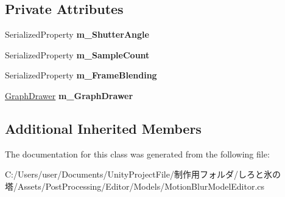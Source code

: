 \subsection*{Private Attributes}
\begin{DoxyCompactItemize}
\item 
\mbox{\label{class_unity_editor_1_1_post_processing_1_1_motion_blur_model_editor_a8971598b51aade8888273ed34cbd41c4}} 
Serialized\+Property {\bfseries m\+\_\+\+Shutter\+Angle}
\item 
\mbox{\label{class_unity_editor_1_1_post_processing_1_1_motion_blur_model_editor_af6591ad5bd48220a93255576aa105371}} 
Serialized\+Property {\bfseries m\+\_\+\+Sample\+Count}
\item 
\mbox{\label{class_unity_editor_1_1_post_processing_1_1_motion_blur_model_editor_a71fcbc99722e28f94295ab274af65436}} 
Serialized\+Property {\bfseries m\+\_\+\+Frame\+Blending}
\item 
\mbox{\label{class_unity_editor_1_1_post_processing_1_1_motion_blur_model_editor_aa1875a8330ad6e855a15b28fd9816d51}} 
\hyperlink{class_unity_editor_1_1_post_processing_1_1_motion_blur_model_editor_1_1_graph_drawer}{Graph\+Drawer} {\bfseries m\+\_\+\+Graph\+Drawer}
\end{DoxyCompactItemize}
\subsection*{Additional Inherited Members}


The documentation for this class was generated from the following file\+:\begin{DoxyCompactItemize}
\item 
C\+:/\+Users/user/\+Documents/\+Unity\+Project\+File/制作用フォルダ/しろと氷の塔/\+Assets/\+Post\+Processing/\+Editor/\+Models/Motion\+Blur\+Model\+Editor.\+cs\end{DoxyCompactItemize}
